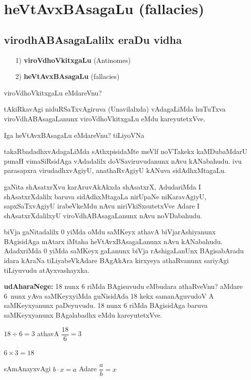 \chapter{heVtAvxBAsagaLu {\rm (fallacies)}}

\section*{virodhABAsagaLalilx eraDu vidha}

\begin{itemize}
\item[{\rm 1)}] {\bf viroVdhoVkitxgaLu} {\rm (Antinomes)}
\item[{\rm 2)}] {\bf heVtAvxBAsagaLu} {\rm (fallacies)}
\end{itemize}

viroVdhoVkitxgaLu eMdareVnu?

tAkiRkavAgi niduRSaTxvAgiruva (Unavilalxda) vAdagaLiMda huTuTxva viroVdhA\-BAsagaLanunx viroVdhoVkitxgaLu eMdu kareyutetxVve.

Iga heVtAvxBAsagaLu eMdareVnu? tiLiyoVNa

takaRbadadhxvAdagaLiMda sAthxpisidaMte meVlf noVTakekx kaMDubaMdarU punaH vimaSiRsidAga vAdadalilx doVSaviruvudanunx nAvu kANabahudu. ivu parasapxra virudadhxvAgiyU, anathaRvAgiyU kANuva sidAdhxMtagaLu.

gaNita shAsatxrXvu karAruvAkAkxda shAsatxrX, AdudariMda I shAsatxrXdalilx baruva sidAdhxMta\-gaLa nirUpaNe niKaravAgiyU, sapxSaTxvAgiyU irabeVkeMdu nAvu niriVkiSxsutetxVve Adare I shAsatxrXdalilxyU viroVdhABAsagaLanunx nAvu noVDabahudu.

biVja gaNitadalilx {\rm 0} yiMda oMdu saMKeyx athavA biVjarAshiyanunx BAgisidAga mAtarx iMtaha heVtAvxBAsagaLanunx nAvu kANabahudu. AdadxriMda {\rm 0} yiMda saMKeyx gaLanunx biVja rAshigaLanUnx BAgisabAradu idara kAraNa tiLiyabeVkAdare BAgAkAra kirxyeya athaRvanunx sariyAgi tiLiyuvudu atAyxvashayxka.

\textbf{udAharaNege:} {\rm 18} nunx {\rm 6} riMda BAgisuvudu eMbudara athaRveVnu? aMdare {\rm 6}~nunx yAva saMKeyxyiMda guNisidAda {\rm 18} kekx samanAguvudoV A saMKeyxyanunx paDeyuvudu. {\rm 18} nunx {\rm 6} riMda BAgisidAga baruva saMKeyxyanunx BAgalabadhx eMdu kareyutetxVve.
\begin{center}
$18\div 6=3$ \quad athavA \quad $\dfrac{18}{6}=3$

$6\times3=18$

sAmAnayxvAgi \quad $b\cdot x=a$ \quad Adare \quad $\dfrac{a}{b}=x$
\end{center}

